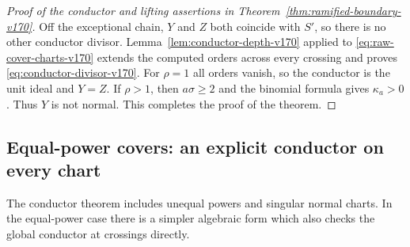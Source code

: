 \documentclass[11pt,reqno]{amsart}
\numberwithin{equation}{section}
\theoremstyle{definition}\newtheorem{definition}[theorem]{Definition}
\theoremstyle{remark}\newtheorem{remark}[theorem]{Remark}
\begin{document}
\begin{proof}[Proof of the conductor and lifting assertions in
Theorem~\ref{thm:ramified-boundary-v170}]
Off the exceptional chain, $Y$ and $Z$ both coincide with $S'$, so
there is no other conductor divisor. Lemma~\ref{lem:conductor-depth-v170}
applied to \eqref{eq:raw-cover-charts-v170} extends the computed
orders across every crossing and proves
\eqref{eq:conductor-divisor-v170}. For $\rho=1$ all orders vanish,
so the conductor is the unit ideal and $Y=Z$. If $\rho>1$, then
$a\sigma\geq2$ and the binomial formula gives $\kappa_a>0$.
Thus $Y$ is not normal. This completes the proof of the theorem.
\end{proof}

\subsection{Equal-power covers: an explicit conductor on every chart}
The conductor theorem includes unequal powers and singular normal
charts. In the equal-power case there is a simpler algebraic form
which also checks the global conductor at crossings directly.
\end{document}
